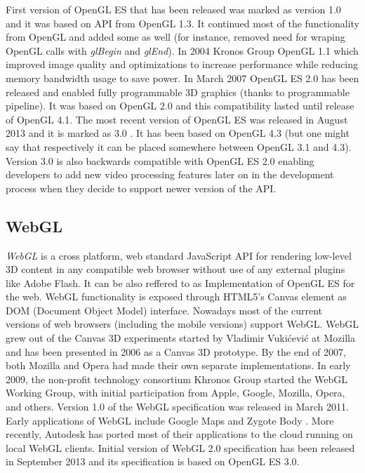 First version of OpenGL ES that has been released was marked as version 1.0 and it was based on API from OpenGL 1.3.
It continued most of the functionality from OpenGL and added some as well (for instance, removed need for wraping OpenGL calls with \emph{glBegin} and \emph{glEnd}).
\newline In 2004 Kronos Group OpenGL 1.1 which improved image quality and optimizations to increase performance while reducing memory bandwidth usage to save power.
\newline In March 2007 OpenGL ES 2.0 has been released and enabled fully programmable 3D graphics (thanks to programmable pipeline).
It was based on OpenGL 2.0 and this compatibility lasted until release of OpenGL 4.1.
\newline The most recent version of OpenGL ES was released in August 2013 and it is marked as 3.0 \cite{opengl_es3_spec}.
It has been based on OpenGL 4.3 (but one might say that respectively it can be placed somewhere between OpenGL 3.1 and 4.3).
Version 3.0 is also backwards compatible with OpenGL ES 2.0 enabling developers to add new video processing features later on in the development process when they decide to support newer version of the API.

\subsection{WebGL}
\emph{WebGL} \cite{webgl_kronos} is a cross platform, web standard JavaScript API for rendering low-level 3D content in any compatible web browser without use of any external plugins like Adobe Flash.
It can be also reffered to as Implementation of OpenGL ES for the web.
WebGL functionality is exposed through HTML5's Canvas element as DOM (Document Object Model) interface.
Nowadays most of the current versions of web browsers (including the mobile versions) support WebGL.
WebGL grew out of the Canvas 3D experiments started by Vladimir Vukićević at Mozilla and has been presented in 2006 as a Canvas 3D prototype.
By the end of 2007, both Mozilla and Opera had made their own separate implementations.
In early 2009, the non-profit technology consortium Khronos Group started the WebGL Working Group, with initial participation from Apple, Google, Mozilla, Opera, and others.
Version 1.0 of the WebGL specification was released in March 2011.
Early applications of WebGL include Google Maps and Zygote Body \cite{zygote_body}.
More recently, Autodesk has ported most of their applications to the cloud running on local WebGL clients.
Initial version of WebGL 2.0 specification has been released in September 2013 and its specification is based on OpenGL ES 3.0.

